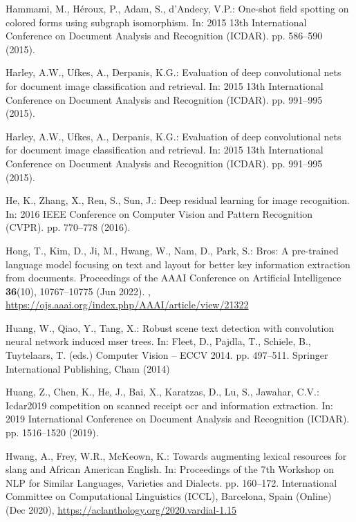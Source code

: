 \documentclass[runningheads]{llncs}
\begin{document}
\begin{thebibliography}{10}
Hammami, M., Héroux, P., Adam, S., d'Andecy, V.P.: One-shot field spotting on
  colored forms using subgraph isomorphism. In: 2015 13th International
  Conference on Document Analysis and Recognition (ICDAR). pp. 586--590 (2015).

Harley, A.W., Ufkes, A., Derpanis, K.G.: Evaluation of deep convolutional nets
  for document image classification and retrieval. In: 2015 13th International
  Conference on Document Analysis and Recognition (ICDAR). pp. 991--995 (2015).

Harley, A.W., Ufkes, A., Derpanis, K.G.: Evaluation of deep convolutional nets
  for document image classification and retrieval. In: 2015 13th International
  Conference on Document Analysis and Recognition (ICDAR). pp. 991--995 (2015).

He, K., Zhang, X., Ren, S., Sun, J.: Deep residual learning for image
  recognition. In: 2016 IEEE Conference on Computer Vision and Pattern
  Recognition (CVPR). pp. 770--778 (2016). 

Hong, T., Kim, D., Ji, M., Hwang, W., Nam, D., Park, S.: Bros: A pre-trained
  language model focusing on text and layout for better key information
  extraction from documents. Proceedings of the AAAI Conference on Artificial
  Intelligence  \textbf{36}(10),  10767--10775 (Jun 2022).
  ,
  \url{https://ojs.aaai.org/index.php/AAAI/article/view/21322}

Huang, W., Qiao, Y., Tang, X.: Robust scene text detection with convolution
  neural network induced mser trees. In: Fleet, D., Pajdla, T., Schiele, B.,
  Tuytelaars, T. (eds.) Computer Vision -- ECCV 2014. pp. 497--511. Springer
  International Publishing, Cham (2014)

Huang, Z., Chen, K., He, J., Bai, X., Karatzas, D., Lu, S., Jawahar, C.V.:
  Icdar2019 competition on scanned receipt ocr and information extraction. In:
  2019 International Conference on Document Analysis and Recognition (ICDAR).
  pp. 1516--1520 (2019). 

Hwang, A., Frey, W.R., McKeown, K.: Towards augmenting lexical resources for
  slang and {A}frican {A}merican {E}nglish. In: Proceedings of the 7th Workshop
  on NLP for Similar Languages, Varieties and Dialects. pp. 160--172.
  International Committee on Computational Linguistics (ICCL), Barcelona, Spain
  (Online) (Dec 2020), \url{https://aclanthology.org/2020.vardial-1.15}


\end{thebibliography}
\end{document}
